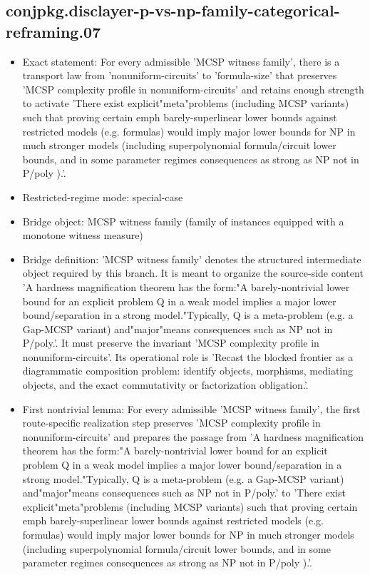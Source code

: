 \documentclass[11pt]{article}
\begin{document}
\subsection*{conjpkg.disclayer-p-vs-np-family-categorical-reframing.07}
\begin{itemize}
\item Exact statement: For every admissible 'MCSP witness family', there is a transport law from 'nonuniform-circuits' to 'formula-size' that preserves 'MCSP complexity profile in nonuniform-circuits' and retains enough strength to activate 'There exist explicit"meta"problems (including MCSP variants) such that proving certain emph barely-superlinear lower bounds against restricted models (e.g. formulas) would imply major lower bounds for NP in much stronger models (including superpolynomial formula/circuit lower bounds, and in some parameter regimes consequences as strong as NP not in P/poly ).'.
\item Restricted-regime mode: special-case
\item Bridge object: MCSP witness family (family of instances equipped with a monotone witness measure)
\item Bridge definition: 'MCSP witness family' denotes the structured intermediate object required by this branch. It is meant to organize the source-side content 'A hardness magnification theorem has the form:"A barely-nontrivial lower bound for an explicit problem Q in a weak model implies a major lower bound/separation in a strong model."Typically, Q is a meta-problem (e.g. a Gap-MCSP variant) and"major"means consequences such as NP not in P/poly.'. It must preserve the invariant 'MCSP complexity profile in nonuniform-circuits'. Its operational role is 'Recast the blocked frontier as a diagrammatic composition problem: identify objects, morphisms, mediating objects, and the exact commutativity or factorization obligation.'.
\item First nontrivial lemma: For every admissible 'MCSP witness family', the first route-specific realization step preserves 'MCSP complexity profile in nonuniform-circuits' and prepares the passage from 'A hardness magnification theorem has the form:"A barely-nontrivial lower bound for an explicit problem Q in a weak model implies a major lower bound/separation in a strong model."Typically, Q is a meta-problem (e.g. a Gap-MCSP variant) and"major"means consequences such as NP not in P/poly.' to 'There exist explicit"meta"problems (including MCSP variants) such that proving certain emph barely-superlinear lower bounds against restricted models (e.g. formulas) would imply major lower bounds for NP in much stronger models (including superpolynomial formula/circuit lower bounds, and in some parameter regimes consequences as strong as NP not in P/poly ).'.

\end{itemize}
\end{document}
